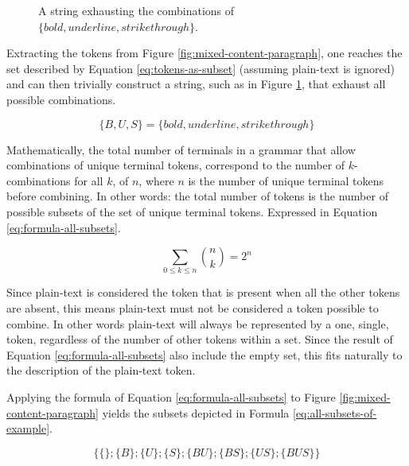 \documentclass{scrreprt}
\begin{document}
\begin{figure}[h]
\centering
{}
\caption{A string exhausting the combinations of $\{bold, underline, strikethrough\}$.}
\label{fig:mixed-content-paragraph-complex}
\end{figure}


Extracting the tokens from Figure \ref{fig:mixed-content-paragraph}, one reaches the set described by Equation \ref{eq:tokens-as-subset} (assuming plain-text is ignored) and can then trivially construct a string, such as in Figure \ref{fig:mixed-content-paragraph-complex}, that exhaust all possible combinations.



\begin{equation}
\{B, U, S\} = \{bold, underline, strikethrough\}
\label{eq:tokens-as-subset}
\end{equation}



Mathematically, the total number of terminals in a grammar that allow combinations of unique terminal tokens, correspond to the number of $k$-combinations for all $k$, of $n$, where $n$ is the number of unique terminal tokens before combining. In other words: the total number of tokens is the number of possible subsets of the set of unique terminal tokens. Expressed in Equation \ref{eq:formula-all-subsets}.

\begin{equation}
\sum_{0\leq{k}\leq{n}} {n \choose k} = 2^n
\label{eq:formula-all-subsets}
\end{equation}

Since plain-text is considered the token that is present when all the other tokens are absent, this means plain-text must not be considered a token possible to combine. In other words plain-text will always be represented by a one, single, token, regardless of the number of other tokens within a set. Since the result of Equation \ref{eq:formula-all-subsets} also include the empty set, this fits naturally to the description of the plain-text token.

Applying the formula of Equation \ref{eq:formula-all-subsets} to Figure \ref{fig:mixed-content-paragraph} yields the subsets depicted in Formula \ref{eq:all-subsets-of-example}.

\begin{equation}
\{\{\};\{B\};\{U\};\{S\};\{BU\};\{BS\};\{US\};\{BUS\}\}
\label{eq:all-subsets-of-example}
\end{equation}
\end{document}
